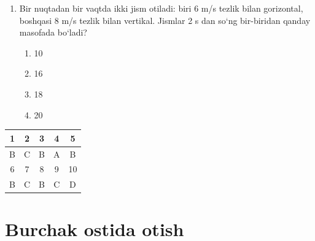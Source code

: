 \begin{enumerate}
\begin{enumerate}[label=\Alph*)]
\item 25
\item 30
\item 35
\item 40
\end{enumerate}

\item Bir nuqtadan bir vaqtda ikki jism otiladi: biri 6 m/s tezlik bilan gorizontal, boshqasi 8 m/s tezlik bilan vertikal. Jismlar 2 s dan so‘ng bir-biridan qanday masofada bo‘ladi?

\begin{enumerate}[label=\Alph*)]
\item 10
\item 16
\item 18
\item 20
\end{enumerate}
\end{enumerate}


\begin{center}
\begin{tabular}{|c|c|c|c|c|}
\hline
1 & 2 & 3 & 4& 5 \\
\hline
B & C & B & A & B \\
\hline
6 & 7 & 8 & 9 & 10 \\
\hline
B & C & B & C & D \\
\hline
\end{tabular}
\end{center}





\section{Burchak ostida otish}

